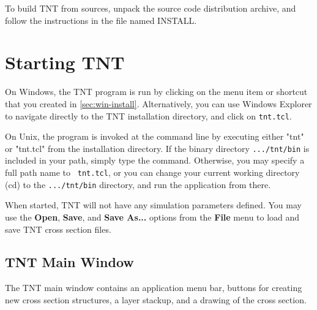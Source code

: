 \documentclass{article}
\begin{document}
To build TNT from sources, unpack the source code distribution
archive, and follow the instructions in the file named INSTALL.



\section {Starting TNT}


On Windows, the TNT program is run by clicking on the menu item or
shortcut that you created in \ref{sec:win-install}.  Alternatively,
you can use Windows Explorer to navigate directly to the TNT
installation directory, and click on {\tt tnt.tcl}.

On Unix, the program is invoked at the command line by executing
either "tnt" or "tnt.tcl" from the installation directory.  If the
binary directory {\tt .../tnt/bin} is included in your path, simply
type the command.  Otherwise, you may specify a full path name to {\tt
tnt.tcl}, or you can change your current working directory (cd) to the
{\tt .../tnt/bin} directory, and run the application from there.

When started, TNT will not have any simulation parameters defined.
You may use the {\bf Open}, {\bf Save}, and {\bf Save As...} options
from the {\bf File} menu to load and save TNT cross section files.

\subsection {TNT Main Window}

The TNT main window contains an application menu bar, buttons for
creating new cross section structures, a layer stackup, and a drawing
of the cross section.
\end{document}
